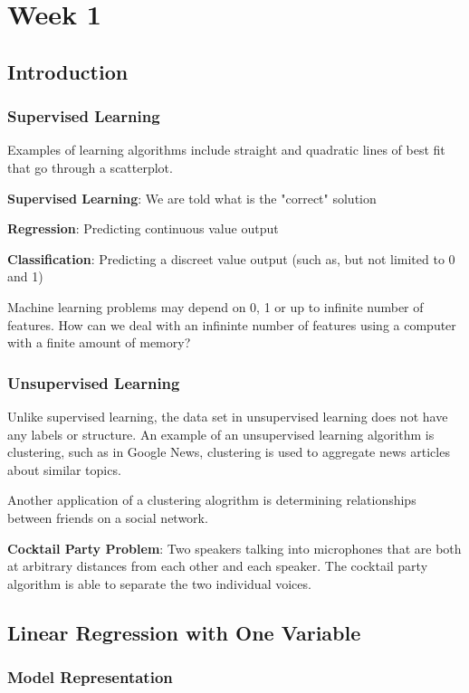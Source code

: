 \maketitle
\chapter{Week 1}
\section{Introduction}
\subsection{Supervised Learning}
Examples of learning algorithms include straight and quadratic lines of best fit that go through a scatterplot.

\textbf{Supervised Learning}: We are told what is the "correct" solution

\textbf{Regression}: Predicting continuous value output

\textbf{Classification}: Predicting a discreet value output (such as, but not limited to 0 and 1) 

Machine learning problems may depend on 0, 1 or up to infinite number of features. How can we deal with an infininte number of features using a computer with a finite amount of memory?

\subsection{Unsupervised Learning}
Unlike supervised learning, the data set in unsupervised learning does not have any labels or structure. An example of an unsupervised learning algorithm is clustering, such as in Google News, clustering is used to aggregate news articles about similar topics.

Another application of a clustering alogrithm is determining relationships between friends on a social network. 

\textbf{Cocktail Party Problem}: Two speakers talking into microphones that are both at arbitrary distances from each other and each speaker. The cocktail party algorithm is able to separate the two individual voices.

\section{Linear Regression with One Variable}
\subsection{Model Representation}

